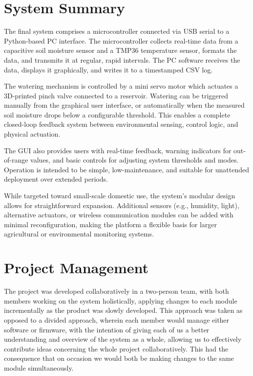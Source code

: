 \documentclass[a4paper,11pt]{article}
\begin{document}
\section{System Summary}
\label{sec:summary}

The final system comprises a microcontroller
connected via USB serial to a Python-based PC interface. 
The microcontroller collects real-time data from a capacitive soil moisture sensor 
and a TMP36 temperature sensor, formats the data, 
and transmits it at regular, rapid intervals. 
The PC software receives the data, displays it graphically, 
and writes it to a timestamped CSV log.

The watering mechanism is controlled by a mini servo motor 
which actuates a 3D-printed pinch valve connected to a reservoir. 
Watering can be triggered manually from the graphical user interface, 
or automatically when the measured soil moisture drops below 
a configurable threshold. 
This enables a complete closed-loop feedback system 
between environmental sensing, control logic, 
and physical actuation.

The GUI also provides users with real-time feedback, 
warning indicators for out-of-range values, 
and basic controls for adjusting system thresholds and modes. 
Operation is intended to be simple, low-maintenance, 
and suitable for unattended deployment over extended periods.

While targeted toward small-scale domestic use, 
the system's modular design allows for straightforward expansion. 
Additional sensors (e.g., humidity, light), 
alternative actuators, or wireless communication modules 
can be added with minimal reconfiguration, 
making the platform a flexible basis for 
larger agricultural or environmental monitoring systems.

\section{Project Management}
\label{sec:project_management}

The project was developed collaboratively in a two-person team, 
with both members working on the system holistically,
applying changes to each module incrementally
as the product was slowly developed.
This approach was taken as opposed to a divided approach,
wherein each member would manage either software or firmware,
with the intention of giving each of us a better understanding 
and overview of the system as a whole,
allowing us to effectively contribute ideas 
concerning the whole project collaboratively. 
This had the consequence that on occasion we would 
both be making changes to the same module simultaneously.
\end{document}
